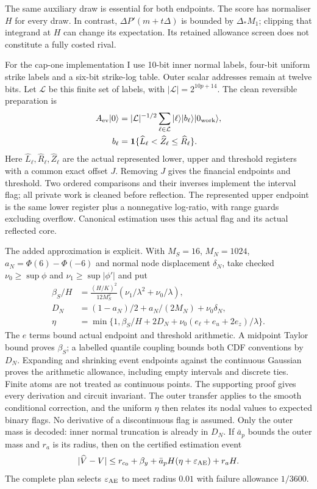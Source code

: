 \documentclass[11pt]{article}
\begin{document}
The same auxiliary draw is essential for both endpoints. The score has
normaliser $H$ for every draw. In contrast,
$\Delta P'(m+t\Delta)$ is bounded by $\Delta_*M_1$; clipping that
integrand at $H$ can change its expectation. Its retained allowance screen
does not constitute a fully costed rival.

For the cap-one implementation I use 10-bit inner normal labels, four-bit
uniform strike labels and a six-bit strike-log table. Outer scalar
addresses remain at twelve bits. Let $\mathcal L$ be this finite set of
labels, with $|\mathcal L|=2^{10p+14}$. The clean reversible preparation is
\begin{align}
A_{\rm ev}|0\rangle
&=|\mathcal L|^{-1/2}\sum_{\ell\in\mathcal L}
 |\ell\rangle|b_\ell\rangle|0_{\rm work}\rangle,\\
b_\ell&=\mathbf1\{\widehat L_\ell<\widehat Z_\ell
                         \leq\widehat R_\ell\}.
\end{align}
Here $\widehat L_\ell,\widehat R_\ell,\widehat Z_\ell$ are the actual
represented lower, upper and threshold registers with a common exact
offset $J$. Removing $J$ gives the financial endpoints and threshold.
Two ordered comparisons and their inverses implement the interval flag;
all private work is cleaned before reflection. The represented upper
endpoint is the same lower register plus a nonnegative log-ratio, with
range guards excluding overflow. Canonical estimation uses this actual
flag and its actual reflected core.

The added approximation is explicit. With $M_S=16$, $M_N=1024$,
$a_N=\Phi(6)-\Phi(-6)$ and normal node displacement $\delta_N$, take
checked $\nu_0\geq\sup\phi$ and $\nu_1\geq\sup|\phi'|$ and put
\begin{align}
\beta_S/H&=\frac{(H/K)^2}{12M_S^2}
               (\nu_1/\lambda^2+\nu_0/\lambda),\\
D_N&=(1-a_N)/2+a_N/(2M_N)+\nu_0\delta_N,\\
\eta&=\min\{1,\beta_S/H+2D_N+
                    \nu_0(e_\ell+e_u+2e_z)/\lambda\}.
\end{align}
The $e$ terms bound actual endpoint and threshold arithmetic. A midpoint
Taylor bound proves $\beta_S$; a labelled quantile coupling bounds both
CDF conventions by $D_N$. Expanding and shrinking event endpoints against
the continuous Gaussian proves the arithmetic allowance, including empty
intervals and discrete ties. Finite atoms are not treated as continuous
points. The supporting proof gives every derivation and circuit invariant.
The outer transfer applies to the smooth conditional correction, and
the uniform $\eta$ then relates its nodal values to expected binary flags.
No derivative of a discontinuous flag is assumed. Only the outer mass is
decoded: inner normal truncation is already in $D_N$. If $\bar a_p$ bounds
the outer mass and $r_a$ is its radius, then on the certified estimation event
\begin{equation}
|\widehat V-V|\leq r_{c_0}+\beta_y+
             \bar a_pH(\eta+\varepsilon_{\rm AE})+r_aH.
\end{equation}
The complete plan selects $\varepsilon_{\rm AE}$ to meet radius $0.01$
with failure allowance $1/3600$.
\end{document}
